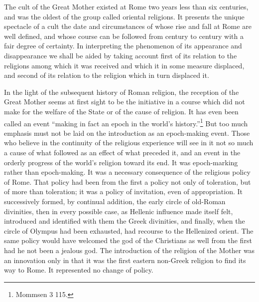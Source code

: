 \documentclass[a4paper, 11pt, oneside, polutonikogreek, french]{article}
\begin{document}
The cult of the Great Mother existed at Rome two years less than six centuries, and was the oldest of the group called oriental religions. It presents the unique spectacle of a cult the date and circumstances of whose rise and fall at Rome are well defined, and whose course can be followed from century to century with a fair degree of certainty. In interpreting the phenomenon of its appearance and disappearance we shall be aided by taking account first of its relation to the religions among which it was received and which it in some measure displaced, and second of its relation to the religion which in turn displaced it.

In the light of the subsequent history of Roman religion, the reception of the Great Mother seems at first sight to be the initiative in a course which did not make for the welfare of the State or of the cause of religion. It has even been called an event ``making in fact an epoch in the world's history.''\footnote{Mommsen 3 115.} But too much emphasis must not be laid on the introduction as an epoch-making event. Those who believe in the continuity of the religious experience will see in it not so much a cause of what followed as an effect of what preceded it, and an event in the orderly progress of the world's religion toward its end. It was epoch-marking rather than epoch-making. It was a necessary consequence of the religious policy of Rome. That policy had been from the first a policy not only of toleration, but of more than toleration; it was a policy of invitation, even of appropriation. It successively formed, by continual addition, the early circle of old-Roman divinities, then in every possible case, as Hellenic influence made itself felt, introduced and identified with them the Greek divinities, and finally, when the circle of Olympus had been exhausted, had recourse to the Hellenized orient. The same policy would have welcomed the god of the Christians as well from the first had he not been a jealous god. The introduction of the religion of the Mother was an innovation only in that it was the first eastern non-Greek religion to find its way to Rome. It represented no change of policy.
\end{document}
